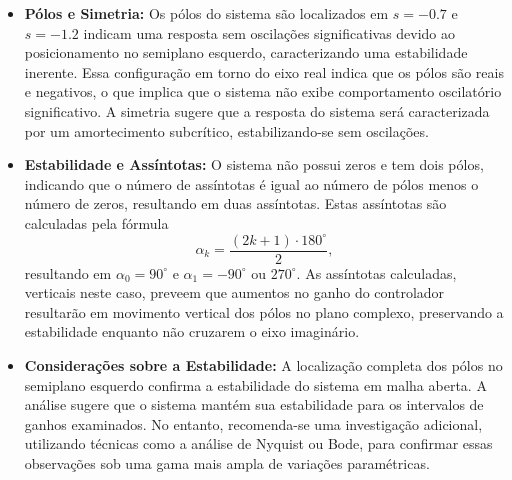\begin{itemize}
    \item \textbf{Pólos e Simetria:}
          Os pólos do sistema são localizados em \( s = -0.7 \) e \( s = -1.2 \) indicam uma resposta sem oscilações significativas devido ao posicionamento no semiplano esquerdo, caracterizando uma estabilidade inerente. Essa configuração em torno do eixo real indica que os pólos são reais e negativos, o que implica que o sistema não exibe comportamento oscilatório significativo. A simetria sugere que a resposta do sistema será caracterizada por um amortecimento subcrítico, estabilizando-se sem oscilações.

    \item \textbf{Estabilidade e Assíntotas:}
          O sistema não possui zeros e tem dois pólos, indicando que o número de assíntotas é igual ao número de pólos menos o número de zeros, resultando em duas assíntotas. Estas assíntotas são calculadas pela fórmula \[
              \alpha_k = \frac{(2k + 1) \cdot 180^\circ}{2},
          \] resultando em \( \alpha_0 = 90^\circ \) e \( \alpha_1 = -90^\circ \) ou \( 270^\circ \). As assíntotas calculadas, verticais neste caso, preveem que aumentos no ganho do controlador resultarão em movimento vertical dos pólos no plano complexo, preservando a estabilidade enquanto não cruzarem o eixo imaginário.

    \item \textbf{Considerações sobre a Estabilidade:}
          A localização completa dos pólos no semiplano esquerdo confirma a estabilidade do sistema em malha aberta. A análise sugere que o sistema mantém sua estabilidade para os intervalos de ganhos examinados. No entanto, recomenda-se uma investigação adicional, utilizando técnicas como a análise de Nyquist ou Bode, para confirmar essas observações sob uma gama mais ampla de variações paramétricas.
\end{itemize}


